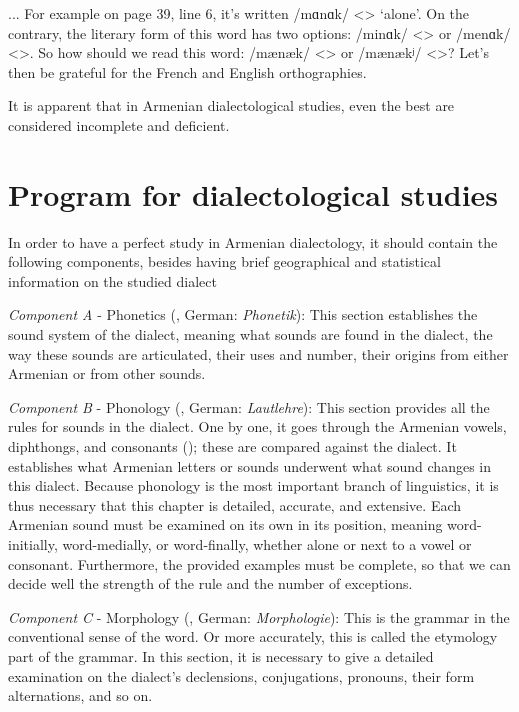 \begin{adjarianpage}\label{page:5}\end{adjarianpage}%

... For example on page 39, line 6, it's written /mɑnɑk/ <> `alone'. On the contrary, the literary form of this word has two options: /minɑk/ <> or /menɑk/ <>. So how should we read this word: /mænæk/ <> or /mænækʲ/ <>? Let's then be grateful for the French and English orthographies. 

It is apparent that in Armenian dialectological studies, even the best are considered incomplete and deficient.



\section{Program for dialectological studies}

In order to have a perfect study in Armenian dialectology, it should contain the following components, besides having brief geographical and statistical information on the studied dialect

\textit{Component A} - Phonetics (, German: \textit{Phonetik}): This section establishes the sound system of the dialect, meaning what sounds are found in the dialect, the way these sounds are articulated, their uses and number, their origins from either Armenian or from other sounds.

\textit{Component B} - Phonology (, German: \textit{Lautlehre}): This section provides all the rules for sounds in the dialect. One by one, it goes through the Armenian vowels, diphthongs, and consonants (); these are compared against the dialect. It establishes what Armenian letters or sounds underwent what sound changes in this dialect. Because phonology is the most important branch of linguistics, it is thus necessary that this chapter is detailed, accurate, and extensive. Each Armenian sound must be examined on its own in its position, meaning word-initially, word-medially, or word-finally, whether alone or next to a vowel or consonant. Furthermore, the provided examples must be complete, so that we can decide well the strength of the rule and the number of exceptions. 

\textit{Component C} - Morphology (, German: \textit{Morphologie}): This is the grammar in the conventional sense of the word. Or more accurately, this is called the etymology part of the grammar. In this section, it is necessary to give a detailed examination on the dialect's declensions, conjugations, pronouns, their form alternations, and so on. 

